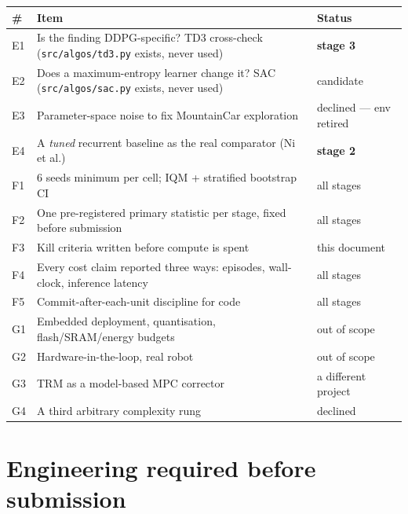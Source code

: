 \documentclass[11pt]{article}
\newcommand{\code}[1]{\texttt{\small #1}}
\begin{document}
\begin{center}\footnotesize
\begin{tabular}{@{}lp{}p{}@{}}
\toprule
\textbf{\#} & \textbf{Item} & \textbf{Status} \\
\midrule
E1 & Is the finding DDPG-specific? TD3 cross-check (\code{src/algos/td3.py} exists, never used) & \textbf{stage 3} \\
E2 & Does a maximum-entropy learner change it? SAC (\code{src/algos/sac.py} exists, never used) & candidate \\
E3 & Parameter-space noise to fix MountainCar exploration & declined --- env retired \\
E4 & A \emph{tuned} recurrent baseline as the real comparator (Ni et al.) & \textbf{stage 2} \\
\midrule
F1 & 6 seeds minimum per cell; IQM + stratified bootstrap CI & all stages \\
F2 & One pre-registered primary statistic per stage, fixed before submission & all stages \\
F3 & Kill criteria written before compute is spent & this document \\
F4 & Every cost claim reported three ways: episodes, wall-clock, inference latency & all stages \\
F5 & Commit-after-each-unit discipline for code & all stages \\
\midrule
G1 & Embedded deployment, quantisation, flash/SRAM/energy budgets & out of scope \\
G2 & Hardware-in-the-loop, real robot & out of scope \\
G3 & TRM as a model-based MPC corrector & a different project \\
G4 & A third arbitrary complexity rung & declined \\
\bottomrule
\end{tabular}
\end{center}

\section{Engineering required before submission}
\end{document}
